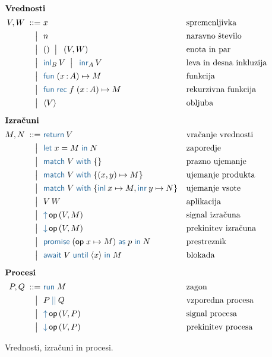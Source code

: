 \begin{figure}[H]

	\centering
	\small
	\begin{align*}
	\intertext{\textbf{Vrednosti}}
	V, W
	\bnfis& x                                       & &\text{spremenljivka} \\
	\bnfor& n    							        & &\text{naravno število} \\
	\bnfor& \tmunit \bnfor\! \tmpair{V}{W}          & &\text{enota in par} \\
	\bnfor& \tminl[B]{V} \bnfor\! \tminr[A]{V}      & &\text{leva in desna inkluzija} \\
	\bnfor& \tmfun{x \of A}{M}                      & &\text{funkcija} \\
	\bnfor& \tmfunrec{f}{x \of A}{M}                  & &\text{rekurzivna funkcija} \\
	\bnfor& \tmpromise V                            & &\text{obljuba}
	\\[1ex]
	\intertext{\textbf{Izračuni}}
	M, N
	\bnfis& \tmreturn{V}                            & &\text{vračanje vrednosti} \\
	\bnfor& \tmlet{x}{M}{N}                         & &\text{zaporedje} \\
	\bnfor& \tmmatch[]{V}{}                         & &\text{prazno ujemanje} \\
	\bnfor& \tmmatch{V}{\tmpair{x}{y} \mapsto M}    & &\text{ujemanje produkta} \\
	\bnfor& \tmmatch{V}{\tminl{x} \mapsto M, \tminr{y} \mapsto N}	& &\text{ujemanje vsote} \\
	\bnfor& V\,W                                    & &\text{aplikacija} \\
	\bnfor& \tmopout{op}{V}{M}       & &\text{signal izračuna} \\
	\bnfor& \tmopin{op}{V}{M}          & &\text{prekinitev izračuna} \\
	\bnfor& \tmwith{op}{x}{M}{p}{N}      & &\text{prestreznik} \\
	\bnfor& \tmawait{V}{x}{M}             & &\text{blokada}
		\\[1ex]
	\intertext{\textbf{Procesi}}
 	P, Q
	\bnfis & \tmrun M & & \text{zagon} \\
	\bnfor & \tmpar P Q & & \text{vzporedna procesa} \\
	\bnfor & \tmopout{op}{V}{P} & & \text{signal procesa} \\
	\bnfor & \tmopin{op}{V}{P} & & \text{prekinitev procesa}
	\end{align*}

	\caption{Vrednosti, izračuni in procesi.}
	\label{fig:izrazi}
\end{figure}


